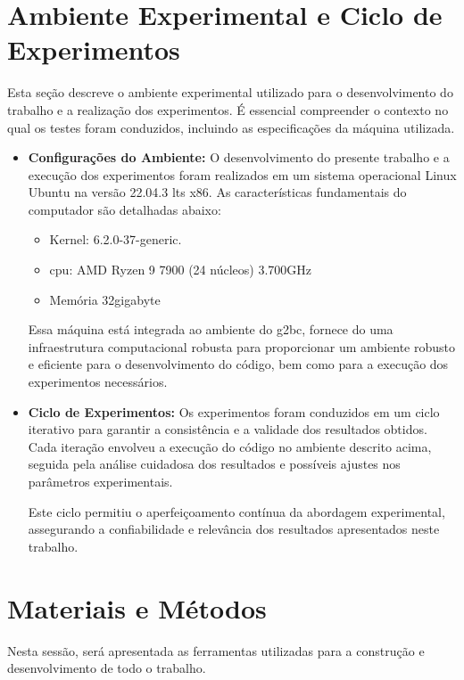 \section{Ambiente Experimental e Ciclo de Experimentos}
Esta seção descreve o ambiente experimental utilizado para o desenvolvimento do trabalho e a realização dos experimentos. É essencial compreender o contexto no qual os testes foram conduzidos, incluindo as especificações da máquina utilizada.

\begin{itemize}

  \item \textbf{Configurações do Ambiente:}
        O desenvolvimento do presente trabalho e a execução dos experimentos foram realizados em um sistema operacional Linux Ubuntu na versão 22.04.3 \gls{lts} x86. As características fundamentais do computador são detalhadas abaixo:
        \begin{itemize}
          \item Kernel: 6.2.0{-}37-generic.
          \item \gls{cpu}: AMD Ryzen 9 7900 (24 núcleos) 3.700GHz
          \item Memória 32\gls{gigabyte}
        \end{itemize}

        Essa máquina está integrada ao ambiente do \gls{g2bc}, fornece do uma infraestrutura computacional robusta para proporcionar um ambiente robusto e eficiente para o desenvolvimento do código, bem como para a execução dos experimentos necessários.

  \item \textbf{Ciclo de Experimentos:}
        Os experimentos foram conduzidos em um ciclo iterativo para garantir a consistência e a validade dos resultados obtidos. Cada iteração envolveu a execução do código no ambiente descrito acima, seguida pela análise cuidadosa dos resultados e possíveis ajustes nos parâmetros experimentais.

        Este ciclo permitiu o aperfeiçoamento contínua da abordagem experimental, assegurando a confiabilidade e relevância dos resultados apresentados neste trabalho.

\end{itemize}
\section{Materiais e Métodos}
Nesta sessão, será apresentada as ferramentas utilizadas para a construção e desenvolvimento de todo o trabalho.

